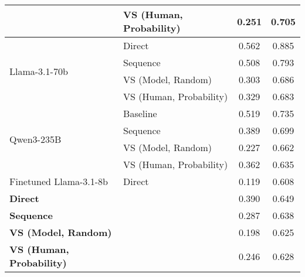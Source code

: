 \begin{table}[!htbp]
{\begin{tabular}{llcc}
& VS (Human, Probability) & \cellcolor{LightSkyBlue!68}0.251 & \cellcolor{LightSkyBlue!4}0.705 \\
\midrule
\multirow{4}{*}{Llama-3.1-70b}
& Direct & 0.562 & 0.885 \\
& Sequence & \cellcolor{LightSkyBlue!20}0.508 & \cellcolor{LightSkyBlue!45}0.793 \\
& VS (Model, Random) & \cellcolor{LightSkyBlue!100}0.303 & \cellcolor{LightSkyBlue!98}0.686 \\
& VS (Human, Probability) & \cellcolor{LightSkyBlue!89}0.329 & \cellcolor{LightSkyBlue!100}0.683 \\
\midrule
\multirow{4}{*}{Qwen3-235B}
& Baseline & 0.519 & 0.735 \\
& Sequence & \cellcolor{LightSkyBlue!44}0.389 & \cellcolor{LightSkyBlue!36}0.699 \\
& VS (Model, Random) & \cellcolor{LightSkyBlue!100}0.227 & \cellcolor{LightSkyBlue!72}0.662 \\
& VS (Human, Probability) & \cellcolor{LightSkyBlue!53}0.362 & \cellcolor{LightSkyBlue!100}0.635 \\
\midrule
\multirow{1}{*}{Finetuned Llama-3.1-8b} 
& Direct & 0.119 & 0.608 \\
\midrule
\rowcolor{gray!15}
\textbf{Direct} & & 0.390 & 0.649 \\
\rowcolor{gray!15}
\textbf{Sequence} & & 0.287 & 0.638 \\
\rowcolor{gray!15}
\textbf{VS (Model, Random)} & & 0.198 & 0.625 \\
\rowcolor{gray!15}
\textbf{VS (Human, Probability)} & & 0.246 & 0.628 \\
\bottomrule
\end{tabular}
}
\end{table}

